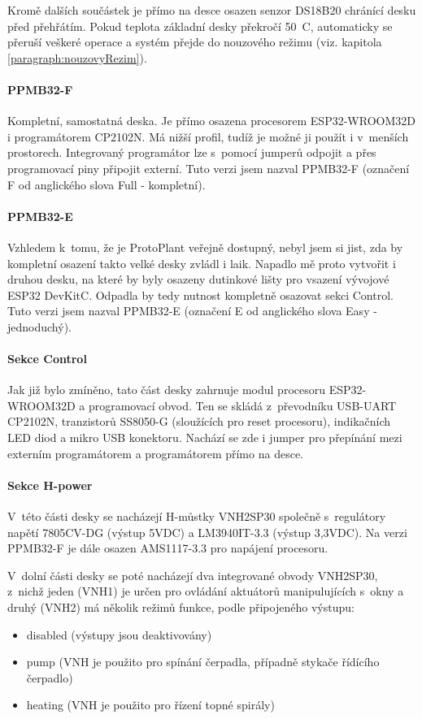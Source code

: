 Kromě dalších součástek je přímo na desce osazen senzor DS18B20 chránící desku před přehřátím. 
Pokud teplota základní desky překročí 50~\degree C, automaticky se přeruší veškeré operace a systém přejde do nouzového režimu (viz. kapitola \ref{paragraph:nouzovyRezim}).

\paragraph{PPMB32-F}
Kompletní, samostatná deska. 
Je přímo osazena procesorem ESP32-WROOM32D i programátorem CP2102N. 
Má nižší profil, tudíž je možné ji použít i v~menších prostorech.
Integrovaný programátor lze s~pomocí jumperů odpojit a přes programovací piny připojit externí. Tuto verzi jsem nazval PPMB32-F (označení F od anglického slova Full - kompletní).

\paragraph{PPMB32-E}
Vzhledem k~tomu, že je ProtoPlant veřejně dostupný, nebyl jsem si jist, zda by kompletní osazení takto velké desky zvládl i laik. 
Napadlo mě proto vytvořit i druhou desku, na které by byly osazeny dutinkové lišty pro vsazení vývojové ESP32 DevKitC. 
Odpadla by tedy nutnost kompletně osazovat sekci Control. 
Tuto verzi jsem nazval PPMB32-E (označení E od anglického slova Easy - jednoduchý).

\paragraph{Sekce Control}
Jak již bylo zmíněno, tato část desky zahrnuje modul procesoru ESP32-WROOM32D a programovací obvod. 
Ten se skládá z~převodníku USB-UART CP2102N, tranzistorů SS8050-G (sloužících pro reset procesoru), indikačních LED diod a mikro USB konektoru. 
Nachází se zde i jumper pro přepínání mezi externím programátorem a programátorem přímo na desce.

\paragraph{Sekce H-power}
V~této části desky se nacházejí H-můstky VNH2SP30 společně s~regulátory napětí 7805CV-DG (výstup 5VDC) a LM3940IT-3.3 (výstup 3,3VDC). 
Na verzi PPMB32-F je dále osazen AMS1117-3.3 pro napájení procesoru. 

V~dolní části desky se poté nacházejí dva integrované obvody VNH2SP30, z~nichž jeden (VNH1) je určen pro ovládání aktuátorů manipulujících s~okny a druhý 
(VNH2) má několik režimů funkce, podle připojeného výstupu:
\begin{itemize}
    \item disabled (výstupy jsou deaktivovány)
    \item pump (VNH je použito pro spínání čerpadla, případně stykače řídícího čerpadlo)
    \item heating (VNH je použito pro řízení topné spirály)
\end{itemize}

